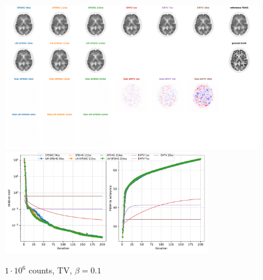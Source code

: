 \begin{figure}
  \centering
    \includegraphics[width=1.0\textwidth]{./figs/brain2d_counts_1.0E+06_seed_1_beta_1.0E-01_prior_TV_niter_ref_20000_fwhm_4.5_4.5_niter_200.png}
    \includegraphics[width=0.8\textwidth]{./figs/brain2d_counts_1.0E+06_seed_1_beta_1.0E-01_prior_TV_niter_ref_20000_fwhm_4.5_4.5_niter_200_metrics.pdf}
  \caption{$1\cdot10^6$ counts, TV, $\beta = 0.1$}
\end{figure}

